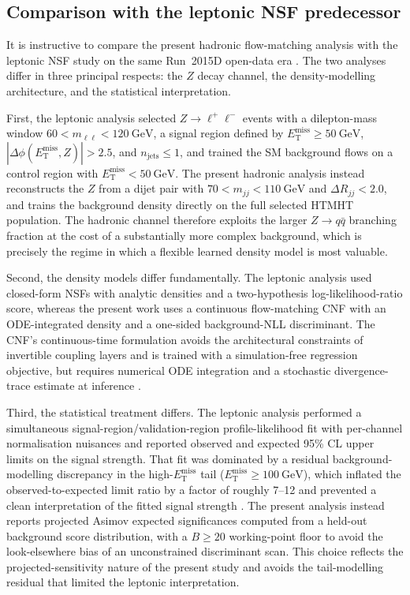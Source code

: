 \documentclass[11pt,a4paper,twocolumn]{article}
\newcommand{\GeV}{\text{GeV}}
\newcommand{\MET}{\ensuremath{E_{\mathrm{T}}^{\mathrm{miss}}}}
\begin{document}
\subsection{Comparison with the leptonic NSF predecessor}

It is instructive to compare the present hadronic flow-matching analysis
with the leptonic NSF study on the same Run~2015D open-data era
\cite{rasineni_nsf_monoz}. The two analyses differ in three principal
respects: the $Z$ decay channel, the density-modelling architecture, and the
statistical interpretation.

First, the leptonic analysis selected $Z\to\ell^{+}\ell^{-}$ events with a
dilepton-mass window $60<m_{\ell\ell}<120~\GeV$, a signal region defined by
$\MET\geq50~\GeV$, $|\Delta\phi(\MET,Z)|>2.5$, and $n_{\mathrm{jets}}\leq1$,
and trained the SM background flows on a control region with
$\MET<50~\GeV$. The present hadronic analysis instead reconstructs the $Z$
from a dijet pair with $70<m_{jj}<110~\GeV$ and $\Delta R_{jj}<2.0$, and
trains the background density directly on the full selected HTMHT
population. The hadronic channel therefore exploits the larger $Z\to
q\bar{q}$ branching fraction at the cost of a substantially more complex
background, which is precisely the regime in which a flexible learned
density model is most valuable.

Second, the density models differ fundamentally. The leptonic analysis used
closed-form NSFs with analytic densities and a two-hypothesis
log-likelihood-ratio score, whereas the present work uses a continuous
flow-matching CNF with an ODE-integrated density and a one-sided
background-NLL discriminant. The CNF's continuous-time formulation avoids
the architectural constraints of invertible coupling layers and is trained
with a simulation-free regression objective, but requires numerical ODE
integration and a stochastic divergence-trace estimate at inference
\cite{lipman_flow_matching,chen_neural_ode,grathwohl_ffjord}.

Third, the statistical treatment differs. The leptonic analysis performed a
simultaneous signal-region/validation-region profile-likelihood fit with
per-channel normalisation nuisances and reported observed and expected
95\% CL upper limits on the signal strength. That fit was dominated by a
residual background-modelling discrepancy in the high-\MET{} tail
($\MET\geq100~\GeV$), which inflated the observed-to-expected limit ratio
by a factor of roughly 7--12 and prevented a clean interpretation of the
fitted signal strength \cite{rasineni_nsf_monoz}. The present analysis
instead reports projected Asimov expected significances
\cite{cowan_asymptotic} computed from a held-out background score
distribution, with a $B\geq20$ working-point floor to avoid the
look-elsewhere bias of an unconstrained discriminant scan. This choice
reflects the projected-sensitivity nature of the present study and avoids
the tail-modelling residual that limited the leptonic interpretation.
\end{document}
